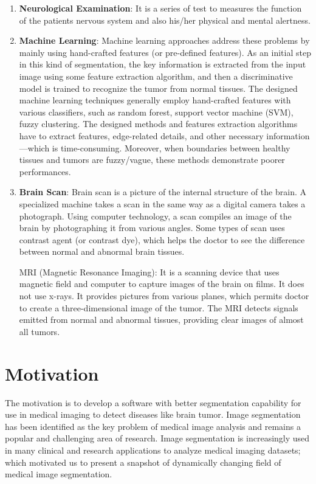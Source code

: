 \documentclass[10pt]{report}
\begin{document}
	\begin{enumerate}
		\item \textbf{Neurological Examination}: It is a series of test to
			measures the function of the patients nervous system and also
			his/her physical and mental alertness.
		\item \textbf{Machine Learning}: Machine learning approaches address
			these problems by mainly using hand-crafted features (or pre-defined
			features). As an initial step in this kind of segmentation, the key
			information is extracted from the input image using some feature
			extraction algorithm, and then a discriminative model is trained to
			recognize the tumor from normal tissues. The designed machine
			learning techniques generally employ hand-crafted features with
			various classifiers, such as random forest, support vector machine
			(SVM), fuzzy clustering. The designed methods and features
			extraction algorithms have to extract features, edge-related
			details, and other necessary information—which is time-consuming.
			Moreover, when boundaries between healthy tissues and tumors are
			fuzzy/vague, these methods demonstrate poorer performances.
		\item \textbf{Brain Scan}: Brain scan is a picture of the internal
			structure of the brain. A specialized machine takes a scan in the
			same way as a digital camera takes a photograph. Using computer
			technology, a scan compiles an image of the brain by photographing
			it from various angles. Some types of scan uses contrast agent (or
			contrast dye), which helps the doctor to see the difference between
			normal and abnormal brain tissues.

			MRI (Magnetic Resonance Imaging): It is a scanning device that uses
			magnetic field and computer to capture images of the brain on films.
			It does not use x-rays. It provides pictures from various planes,
			which permits doctor to create a three-dimensional image of the
			tumor. The MRI detects signals emitted from normal and abnormal
			tissues, providing clear images of almost all tumors.
	\end{enumerate}

	\section[motivation]{Motivation}
	The motivation is to develop a software with better segmentation capability
	for use in medical imaging to detect diseases like brain tumor. Image
	segmentation has been identified as the key problem of medical image
	analysis and remains a popular and challenging area of research. Image
	segmentation is increasingly used in many clinical and research applications
	to analyze medical imaging datasets; which motivated us to present a
	snapshot of dynamically changing field of medical image segmentation.
\end{document}
